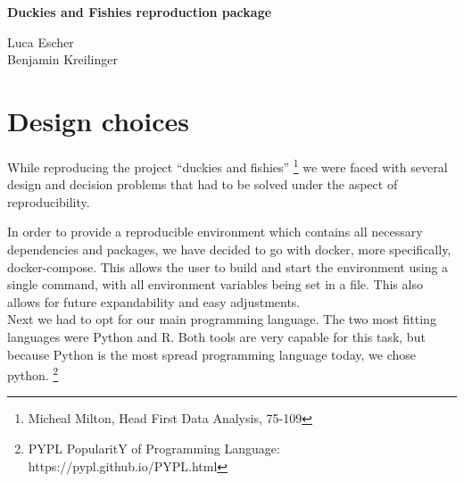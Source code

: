 \documentclass[11pt]{article}
\newenvironment{heading}{\large \centering}\par
\newenvironment{textbody}{\normalsize}\par
\begin{document}
\begin{heading}
\textbf{Duckies and Fishies reproduction package}
\end{heading}

\vspace{0.5cm}

\begin{heading}
    Luca Escher \\
    Benjamin Kreilinger
\end{heading}

\vspace{0.5cm}

\section{Design choices}

\begin{textbody}
While reproducing the project “duckies and fishies” \footnote{Micheal Milton, Head First Data Analysis, 75-109} we were faced with several design and decision problems that had to be solved under the aspect of reproducibility.

In order to provide a reproducible environment which contains all necessary dependencies and packages, we have decided to go with docker, more specifically, docker-compose. This allows the user to build and start the environment using a single command, with all environment variables being set in a file. This also allows for future expandability and easy adjustments. \\

Next we had to opt for our main programming language. The two most fitting languages were Python and R. Both tools are very capable for this task, but because Python is the most spread programming language today, we chose python. \footnote{PYPL PopularitY of Programming Language: https://pypl.github.io/PYPL.html} \\
\end{textbody}
\end{document}

